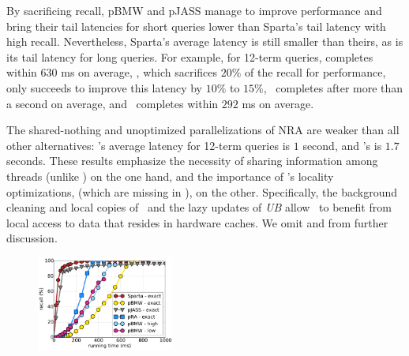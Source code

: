 {{%
By sacrificing recall, pBMW and pJASS manage to improve performance and bring their tail latencies for short queries lower than Sparta’s tail latency with high recall. Nevertheless, Sparta’s average latency is still smaller than theirs, as is  its tail latency for long queries.
For example, for 12-term queries, 
\pBMW\hi\/ completes  within $630$ ms on average, 
\pBMW\lo, 
which sacrifices $20\%$ of the recall for performance, only succeeds to improve this latency by $10\%$ to $15\%$, 
\pJASS\hi\ completes  after more than a second on average, and \pJASS\lo\ completes  within $292$ ms on average.

The shared-nothing and unoptimized parallelizations of NRA are weaker than all other alternatives:
\pNRA's  average latency for 12-term queries is $1$ second, and \sNRA's is $1.7$ seconds. 
These results emphasize the necessity of sharing information among threads (unlike \sNRA) on the one hand,
and the importance of \alg's locality optimizations, (which are missing in \pNRA), on the other. 
Specifically, the background cleaning and local copies of \DMap\ and the lazy updates of \emph{UB} allow \alg\ to benefit from 
local access to data that resides in hardware caches. 
We omit \pNRA\/ and \sNRA\/ from further discussion. 

\begin{figure}[hbt]
\centering
{}
         \includegraphics[width=0.4\textwidth]{figures/cumulative_12threads_clueweb.pdf}
\end{figure}}}
